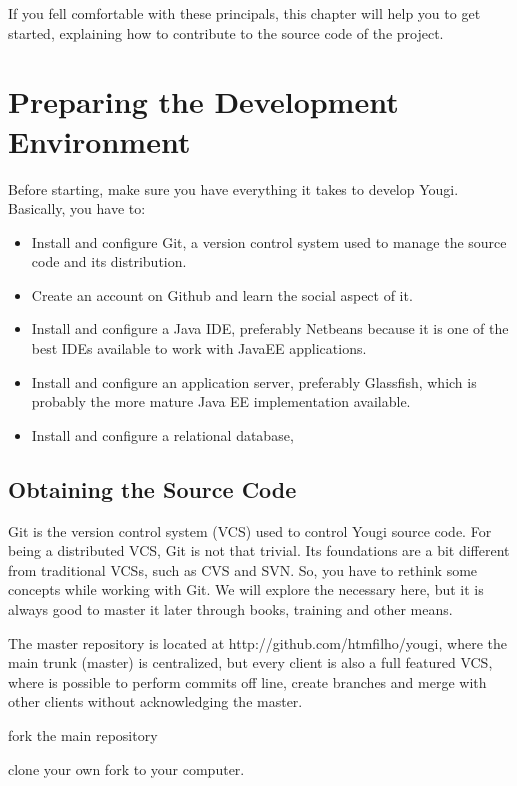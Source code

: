 \documentclass[envcountsame,envcountchap]{svmono}
\begin{document}
If you fell comfortable with these principals, this chapter will help you to get started, explaining how to contribute to the source code of the project.

\section{Preparing the Development Environment}

Before starting, make sure you have everything it takes to develop Yougi. Basically, you have to:

\begin{itemize}
\item Install and configure Git, a version control system used to manage the source code and its distribution.
\item Create an account on Github and learn the social aspect of it.
\item Install and configure a Java IDE, preferably Netbeans because it is one of the best IDEs available to work with JavaEE applications.
\item Install and configure an application server, preferably Glassfish, which is probably the more mature Java EE implementation available.
\item Install and configure a relational database,  
\end{itemize}

\subsection{Obtaining the Source Code}
\label{ssec:obtaining-source-code}

Git is the version control system (VCS) used to control Yougi source code. For being a distributed VCS, Git is not that trivial. Its foundations are a bit different from traditional VCSs, such as CVS and SVN. So, you have to rethink some concepts while working with Git. We will explore the necessary here, but it is always good to master it later through books, training and other means.

The master repository is located at http://github.com/htmfilho/yougi, where the main trunk (master) is centralized, but every client is also a full featured VCS, where is possible to perform commits off line, create branches and merge with other clients without acknowledging the master.

fork the main repository

clone your own fork to your computer.
\end{document}
